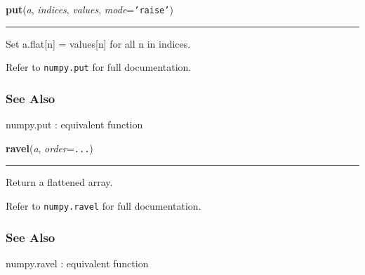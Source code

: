     \label{numpy:ndarray:put}

    \vspace{0.5ex}

    \begin{boxedminipage}{\textwidth}

    \raggedright \textbf{put}(\textit{a}, \textit{indices}, \textit{values}, \textit{mode}=\texttt{'raise'})

    \vspace{-1.5ex}

    \rule{\textwidth}{0.5\fboxrule}

Set a.flat{[}n{]} = values{[}n{]} for all n in indices.

Refer to \texttt{numpy.put} for full documentation.



\hypertarget{see-also}{}
\subsubsection*{See Also}

numpy.put : equivalent function
    \vspace{1ex}

    \end{boxedminipage}

    \label{numpy:ndarray:ravel}

    \vspace{0.5ex}

    \begin{boxedminipage}{\textwidth}

    \raggedright \textbf{ravel}(\textit{a}, \textit{order}=\texttt{...})

    \vspace{-1.5ex}

    \rule{\textwidth}{0.5\fboxrule}

Return a flattened array.

Refer to \texttt{numpy.ravel} for full documentation.



\hypertarget{see-also}{}
\subsubsection*{See Also}

numpy.ravel : equivalent function
    \vspace{1ex}

    \end{boxedminipage}

